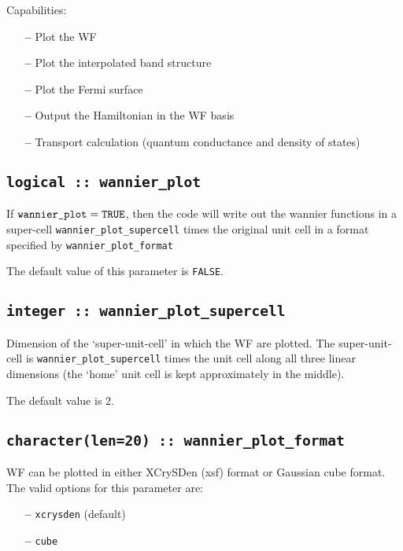  Capabilities:

\begin{itemize}
\item[{\bf --}]  Plot the WF
\item[{\bf --}]  Plot the interpolated band structure 		     
\item[{\bf --}]  Plot the Fermi surface 
\item[{\bf --}]  Output the Hamiltonian in the WF basis			     
\item[{\bf --}]  Transport calculation (quantum conductance and
  density of states)			     
\end{itemize}


\subsection[wannier\_plot]{\tt logical :: wannier\_plot}

If $\verb#wannier_plot#=\verb#TRUE#$, then the code will write out the
wannier functions in a super-cell \verb#wannier_plot_supercell# times
the original unit cell in a format specified by
\verb#wannier_plot_format#

The default value of this parameter is \verb#FALSE#.

\subsection[wannier\_plot\_supercell]{\tt integer :: wannier\_plot\_supercell}

Dimension of the `super-unit-cell' in which the WF are
plotted. The super-unit-cell is \verb#wannier_plot_supercell# times
the unit cell along all three linear dimensions (the `home' unit cell
is kept approximately in the middle).

The default value is 2.

\subsection[wannier\_plot\_format]{\tt character(len=20) :: wannier\_plot\_format}

WF can be plotted in either XCrySDen (xsf) format or Gaussian cube
format. The valid options for this parameter are:
\begin{itemize}
\item[{\bf --}] \verb#xcrysden# (default)
\item[{\bf --}] \verb#cube#
\end{itemize}

